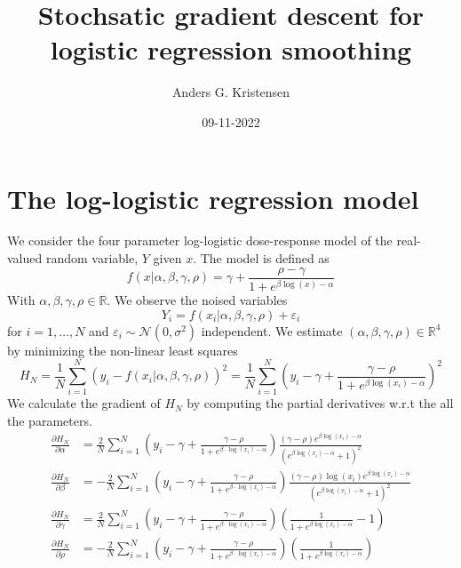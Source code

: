 \documentclass[a4paper, 11 pt]{article}
\title{Stochsatic gradient descent for logistic regression smoothing}
\author{Anders G. Kristensen}
\date{09-11-2022}
\begin{document}
\maketitle
\section{The log-logistic regression model}
\noindent We consider the four parameter log-logistic dose-response model of the real-valued random variable, $Y$ given $x$. The model is defined as
\[
    f(x|\alpha, \beta, \gamma, \rho) = \gamma + \frac{\rho-\gamma}{1+e^{\beta\log(x)-\alpha}}
\]
With $\alpha,\beta,\gamma,\rho\in\mathbb{R}$. We observe the noised variables
\[
    Y_i = f(x_i|\alpha,\beta,\gamma,\rho) + \varepsilon_i    
\]
for $i = 1,\dots, N$ and $\varepsilon_i\sim\mathcal{N}\left(0,\sigma^2\right)$ independent. We estimate $\left(\alpha,\beta,\gamma,\rho\right)\in\mathbb{R}^4$ by minimizing the non-linear least squares
\[
    H_N = \frac{1}{N}\sum_{i = 1}^N (y_i-f(x_i|\alpha,\beta,\gamma,\rho))^2 = \frac{1}{N}\sum_{i = 1}^N \left(y_i - \gamma + \frac{\gamma-\rho}{1+e^{\beta\log(x_i)-\alpha}}\right)^2
\]
We calculate the gradient of $H_N$ by computing the partial derivatives w.r.t the all the parameters.
\begin{align*}
    \frac{\partial H_N}{\partial \alpha}  &=  \frac{2}{N}\sum_{i = 1}^N \left(y_i-\gamma+\frac{\gamma-\rho}{1+e^{\beta\cdot\log(x_i)-\alpha}}\right)\frac{(\gamma-\rho)e^{\beta\log(x_i)-\alpha}}{\left(e^{\beta\log(x_i)-\alpha}+1\right)^2} \\
    \frac{\partial H_N}{\partial \beta}  &=  -\frac{2}{N}\sum_{i = 1}^N \left(y_i-\gamma+\frac{\gamma-\rho}{1+e^{\beta\cdot\log(x_i)-\alpha}}\right)\frac{(\gamma-\rho)\log(x_i)e^{\beta\log(x_i)-\alpha}}{\left(e^{\beta\log(x_i)-\alpha}+1\right)^2}\\
    \frac{\partial H_N}{\partial \gamma}  &=  \frac{2}{N}\sum_{i = 1}^N \left(y_i-\gamma+\frac{\gamma-\rho}{1+e^{\beta\cdot\log(x_i)-\alpha}}\right)\left(\frac{1}{1+e^{\beta\log(x_i)-\alpha}}-1\right)\\
    \frac{\partial H_N}{\partial \rho}  &=  -\frac{2}{N}\sum_{i = 1}^N \left(y_i-\gamma+\frac{\gamma-\rho}{1+e^{\beta\cdot\log(x_i)-\alpha}}\right)\left(\frac{1}{1+e^{\beta\log(x_i)-\alpha}}\right)
\end{align*}
\end{document}
